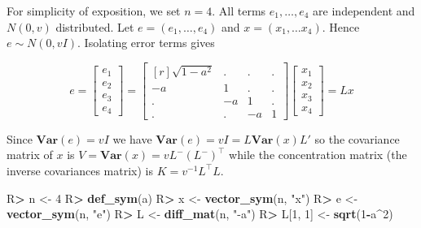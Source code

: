 \documentclass[10pt,]{article}
\newenvironment{Shaded}{\begin{snugshade}}{\end{snugshade}}
\newcommand{\DecValTok}[1]{\textcolor[rgb]{0.00,0.00,0.81}{#1}}
\newcommand{\KeywordTok}[1]{\textcolor[rgb]{0.13,0.29,0.53}{\textbf{#1}}}
\newcommand{\NormalTok}[1]{#1}
\newcommand{\OperatorTok}[1]{\textcolor[rgb]{0.81,0.36,0.00}{\textbf{#1}}}
\newcommand{\StringTok}[1]{\textcolor[rgb]{0.31,0.60,0.02}{#1}}
\begin{document}
For simplicity of exposition, we set \(n=4\). All terms
\(e_1, \dots, e_4\) are independent and \(N(0, v)\) distributed. Let
\(e=(e_1, \dots, e_4)\) and \(x=(x_1, \dots x_4)\). Hence
\(e \sim N(0, v I)\). Isolating error terms gives

\begin{displaymath}
  e= \left[\begin{matrix}e_{1}\\e_{2}\\e_{3}\\e_{4}\end{matrix}\right] = \left[\begin{matrix}[r]\sqrt{1 - a^{2}} & . & . & .\\- a & 1 & . & .\\. & - a & 1 & .\\. & . & - a & 1\end{matrix}\right] \left[\begin{matrix}x_{1}\\x_{2}\\x_{3}\\x_{4}\end{matrix}\right] = L x 
\end{displaymath}

Since \(\mathbf{Var}(e)=v I\) we have
\(\mathbf{Var}(e)=v I=L \mathbf{Var}(x) L'\) so the covariance matrix of
\(x\) is \(V=\mathbf{Var}(x) = v L^- (L^-)^\top\) while the
concentration matrix (the inverse covariances matrix) is
\(K=v^{-1}L^\top L\).

\begin{Shaded}
\begin{Highlighting}[]
\NormalTok{R}\OperatorTok{>}\StringTok{ }\NormalTok{n <-}\StringTok{ }\DecValTok{4}
\NormalTok{R}\OperatorTok{>}\StringTok{ }\KeywordTok{def_sym}\NormalTok{(a)}
\NormalTok{R}\OperatorTok{>}\StringTok{ }\NormalTok{x <-}\StringTok{ }\KeywordTok{vector_sym}\NormalTok{(n, }\StringTok{"x"}\NormalTok{)}
\NormalTok{R}\OperatorTok{>}\StringTok{ }\NormalTok{e <-}\StringTok{ }\KeywordTok{vector_sym}\NormalTok{(n, }\StringTok{"e"}\NormalTok{)}
\NormalTok{R}\OperatorTok{>}\StringTok{ }\NormalTok{L <-}\StringTok{ }\KeywordTok{diff_mat}\NormalTok{(n, }\StringTok{"-a"}\NormalTok{)}
\NormalTok{R}\OperatorTok{>}\StringTok{ }\NormalTok{L[}\DecValTok{1}\NormalTok{, }\DecValTok{1}\NormalTok{] <-}\StringTok{ }\KeywordTok{sqrt}\NormalTok{(}\DecValTok{1}\OperatorTok{-}\NormalTok{a}\OperatorTok{^}\DecValTok{2}\NormalTok{)}
\end{Highlighting}
\end{Shaded}
\end{document}
